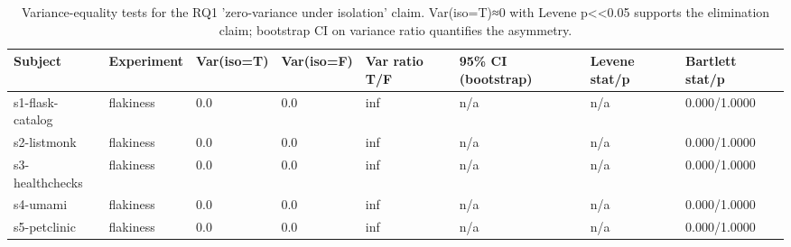 \begin{table}[t]
\centering
\caption{Variance-equality tests for the RQ1 'zero-variance under isolation' claim. Var(iso=T)≈0 with Levene p<<0.05 supports the elimination claim; bootstrap CI on variance ratio quantifies the asymmetry.}
\label{tab:T1_variance_tests}
\begin{tabular}{llllllll}
\hline
Subject & Experiment & Var(iso=T) & Var(iso=F) & Var ratio T/F & 95\% CI (bootstrap) & Levene stat/p & Bartlett stat/p \\
\hline
s1-flask-catalog & flakiness & 0.0 & 0.0 & inf & n/a & n/a & 0.000/1.0000 \\
s2-listmonk & flakiness & 0.0 & 0.0 & inf & n/a & n/a & 0.000/1.0000 \\
s3-healthchecks & flakiness & 0.0 & 0.0 & inf & n/a & n/a & 0.000/1.0000 \\
s4-umami & flakiness & 0.0 & 0.0 & inf & n/a & n/a & 0.000/1.0000 \\
s5-petclinic & flakiness & 0.0 & 0.0 & inf & n/a & n/a & 0.000/1.0000 \\
\hline
\end{tabular}
\end{table}
